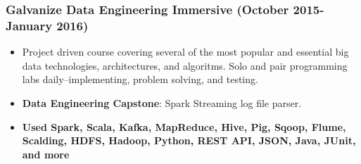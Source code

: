 \documentclass[a4paper,10pt,notitlepage]{article}
\begin{document}
\subsubsection*{Galvanize Data Engineering Immersive (October 2015-January 2016)}
  \begin{itemize}
    \vspace{-5pt} \item Project driven course covering several of the most popular and essential big data technologies, architectures, and algoritms. Solo and pair programming labs daily--implementing, problem solving, and testing.
    \vspace{-5pt} \item \textbf{Data Engineering Capstone}: Spark Streaming log file parser.
    \vspace{-5pt}\item  \textbf{Used Spark, Scala, Kafka, MapReduce, Hive, Pig, Sqoop, Flume, Scalding, HDFS, Hadoop, Python, REST API, JSON, Java, JUnit, and more}
  \end{itemize}
\end{document}
